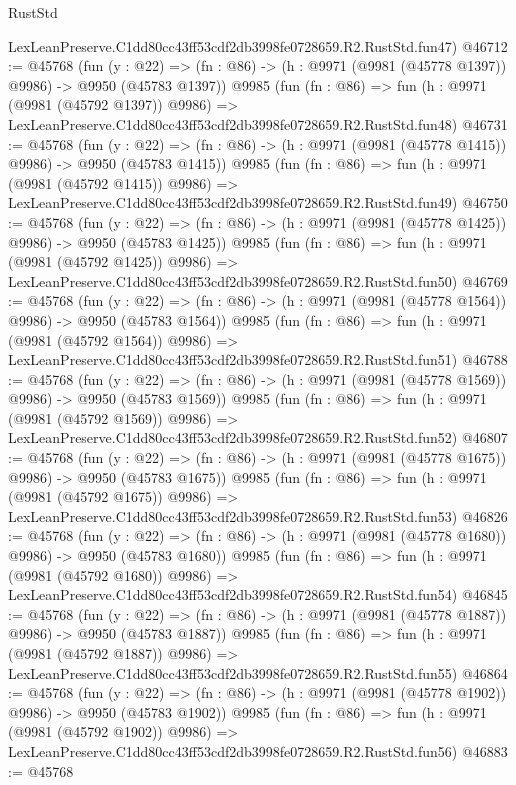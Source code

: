 \begin{lexlean}{RustStd}
\begin{coremodule}
    LexLeanPreserve.C1dd80cc43ff53cdf2db3998fe0728659.R2.RustStd.fun47)
@46712 := @45768
    (fun (y : @22) =>
    (fn : @86) -> (h : @9971 (@9981 (@45778 @1397)) @9986) -> @9950 (@45783 @1397))
    @9985
    (fun (fn : @86) =>
    fun (h : @9971 (@9981 (@45792 @1397)) @9986) =>
    LexLeanPreserve.C1dd80cc43ff53cdf2db3998fe0728659.R2.RustStd.fun48)
@46731 := @45768
    (fun (y : @22) =>
    (fn : @86) -> (h : @9971 (@9981 (@45778 @1415)) @9986) -> @9950 (@45783 @1415))
    @9985
    (fun (fn : @86) =>
    fun (h : @9971 (@9981 (@45792 @1415)) @9986) =>
    LexLeanPreserve.C1dd80cc43ff53cdf2db3998fe0728659.R2.RustStd.fun49)
@46750 := @45768
    (fun (y : @22) =>
    (fn : @86) -> (h : @9971 (@9981 (@45778 @1425)) @9986) -> @9950 (@45783 @1425))
    @9985
    (fun (fn : @86) =>
    fun (h : @9971 (@9981 (@45792 @1425)) @9986) =>
    LexLeanPreserve.C1dd80cc43ff53cdf2db3998fe0728659.R2.RustStd.fun50)
@46769 := @45768
    (fun (y : @22) =>
    (fn : @86) -> (h : @9971 (@9981 (@45778 @1564)) @9986) -> @9950 (@45783 @1564))
    @9985
    (fun (fn : @86) =>
    fun (h : @9971 (@9981 (@45792 @1564)) @9986) =>
    LexLeanPreserve.C1dd80cc43ff53cdf2db3998fe0728659.R2.RustStd.fun51)
@46788 := @45768
    (fun (y : @22) =>
    (fn : @86) -> (h : @9971 (@9981 (@45778 @1569)) @9986) -> @9950 (@45783 @1569))
    @9985
    (fun (fn : @86) =>
    fun (h : @9971 (@9981 (@45792 @1569)) @9986) =>
    LexLeanPreserve.C1dd80cc43ff53cdf2db3998fe0728659.R2.RustStd.fun52)
@46807 := @45768
    (fun (y : @22) =>
    (fn : @86) -> (h : @9971 (@9981 (@45778 @1675)) @9986) -> @9950 (@45783 @1675))
    @9985
    (fun (fn : @86) =>
    fun (h : @9971 (@9981 (@45792 @1675)) @9986) =>
    LexLeanPreserve.C1dd80cc43ff53cdf2db3998fe0728659.R2.RustStd.fun53)
@46826 := @45768
    (fun (y : @22) =>
    (fn : @86) -> (h : @9971 (@9981 (@45778 @1680)) @9986) -> @9950 (@45783 @1680))
    @9985
    (fun (fn : @86) =>
    fun (h : @9971 (@9981 (@45792 @1680)) @9986) =>
    LexLeanPreserve.C1dd80cc43ff53cdf2db3998fe0728659.R2.RustStd.fun54)
@46845 := @45768
    (fun (y : @22) =>
    (fn : @86) -> (h : @9971 (@9981 (@45778 @1887)) @9986) -> @9950 (@45783 @1887))
    @9985
    (fun (fn : @86) =>
    fun (h : @9971 (@9981 (@45792 @1887)) @9986) =>
    LexLeanPreserve.C1dd80cc43ff53cdf2db3998fe0728659.R2.RustStd.fun55)
@46864 := @45768
    (fun (y : @22) =>
    (fn : @86) -> (h : @9971 (@9981 (@45778 @1902)) @9986) -> @9950 (@45783 @1902))
    @9985
    (fun (fn : @86) =>
    fun (h : @9971 (@9981 (@45792 @1902)) @9986) =>
    LexLeanPreserve.C1dd80cc43ff53cdf2db3998fe0728659.R2.RustStd.fun56)
@46883 := @45768

\end{coremodule}
\end{lexlean}
